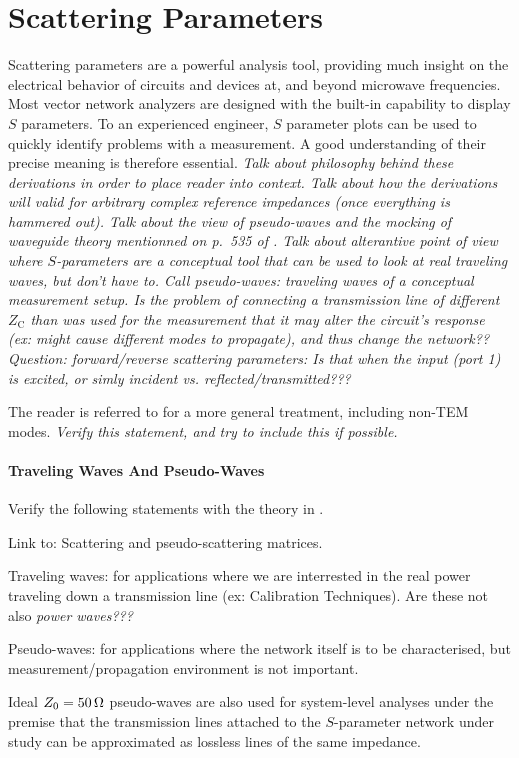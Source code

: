 %
\chapter{Scattering Parameters}
\par Scattering parameters are a powerful analysis tool, providing much insight on the electrical behavior of circuits and devices at, and beyond microwave frequencies. Most vector network analyzers are designed with the built-in capability to display $S$ parameters. To an experienced engineer, $S$ parameter plots can be used to quickly identify problems with a measurement. A good understanding of their precise meaning is therefore essential. \emph{Talk about philosophy behind these derivations in order to place reader into context. Talk about how the derivations will valid for arbitrary complex reference impedances (once everything is hammered out). Talk about the view of pseudo-waves and the mocking of waveguide theory mentionned on p.\ 535 of \cite{pr:Marks_1992}. Talk about alterantive point of view where $S$-parameters are a conceptual tool that can be used to look at real traveling waves, but don't have to. Call pseudo-waves: traveling waves of a conceptual measurement setup. Is the problem of connecting a transmission line of different $Z_\mathrm{C}$ than was used for the measurement that it may alter the circuit's response (ex: might cause different modes to propagate), and thus change the network?? Question: forward/reverse scattering parameters: Is that when the input (port 1) is excited, or simly incident vs. reflected/transmitted???}
%
\par The reader is referred to \cite{bk:Collin_1992}\cite{pr:Marks_1992}\cite{bk:Pozar_2005} for a more general treatment, including non-TEM modes. \emph{Verify this statement, and try to include this if possible.}
%
\subsubsection{Traveling Waves And Pseudo-Waves}
\par Verify the following statements with the theory in \cite{pr:Marks_1992}.
\par Link to: Scattering and pseudo-scattering matrices.
\par Traveling waves: for applications where we are interrested in the real power traveling down a transmission line (ex: Calibration Techniques). Are these not also \emph{power waves???}
\par Pseudo-waves: for applications where the network itself is to be characterised, but measurement/propagation environment is not important.
\par Ideal $Z_\mathrm{0}=50\mathrm{\,\Omega}$ pseudo-waves are also used for system-level analyses under the premise that the transmission lines attached to the $S$-parameter network under study can be approximated as lossless lines of the same impedance.
%
%
%
